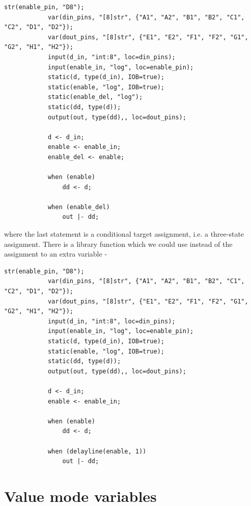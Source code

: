         \begin{lstlisting}[language=threepl]
            str(enable_pin, "D8");
            var(din_pins, "[8]str", {"A1", "A2", "B1", "B2", "C1", "C2", "D1", "D2"});
            var(dout_pins, "[8]str", {"E1", "E2", "F1", "F2", "G1", "G2", "H1", "H2"});
            input(d_in, "int:8", loc=din_pins);
            input(enable_in, "log", loc=enable_pin);
            static(d, type(d_in), IOB=true);
            static(enable, "log", IOB=true);       
            static(enable_del, "log");
            static(dd, type(d));
            output(out, type(dd),, loc=dout_pins);

            d <- d_in;
            enable <- enable_in;
            enable_del <- enable;

            when (enable)
                dd <- d;

            when (enable_del)
                out |- dd;
        \end{lstlisting}

        where the last statement is a conditional target assignment, i.e. a
        three-state assignment. There is a library function  which
        we could use instead of the assignment to an extra variable -

        \begin{lstlisting}[language=threepl]
            str(enable_pin, "D8");
            var(din_pins, "[8]str", {"A1", "A2", "B1", "B2", "C1", "C2", "D1", "D2"});
            var(dout_pins, "[8]str", {"E1", "E2", "F1", "F2", "G1", "G2", "H1", "H2"});
            input(d_in, "int:8", loc=din_pins);
            input(enable_in, "log", loc=enable_pin);
            static(d, type(d_in), IOB=true);
            static(enable, "log", IOB=true);       
            static(dd, type(d));
            output(out, type(dd),, loc=dout_pins);

            d <- d_in;
            enable <- enable_in;

            when (enable)
                dd <- d;

            when (delayline(enable, 1))
                out |- dd;
        \end{lstlisting}



    \section{Value mode variables}

